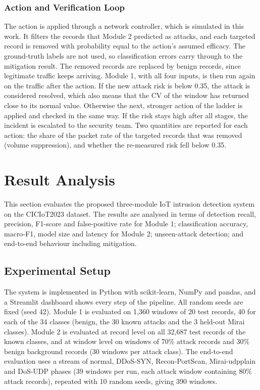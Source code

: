 \documentclass[]{interact}
\theoremstyle{plain}%
\theoremstyle{definition}
\theoremstyle{remark}
\begin{document}
\subsubsection{Action and Verification Loop}
The action is applied through a network controller, which is simulated in this work. It filters the records that Module 2 predicted as attacks, and each targeted record is removed with probability equal to the action's assumed efficacy. The ground-truth labels are not used, so classification errors carry through to the mitigation result. The removed records are replaced by benign records, since legitimate traffic keeps arriving. Module 1, with all four inputs, is then run again on the traffic after the action. If the new attack risk is below 0.35, the attack is considered resolved, which also means that the CV of the window has returned close to its normal value. Otherwise the next, stronger action of the ladder is applied and checked in the same way. If the risk stays high after all stages, the incident is escalated to the security team. Two quantities are reported for each action: the share of the packet rate of the targeted records that was removed (volume suppression), and whether the re-measured risk fell below 0.35.

\section{Result Analysis}
This section evaluates the proposed three-module IoT intrusion detection system on the CICIoT2023 dataset. The results are analysed in terms of detection recall, precision, F1-score and false-positive rate for Module 1; classification accuracy, macro-F1, model size and latency for Module 2; unseen-attack detection; and end-to-end behaviour including mitigation.

\subsection{Experimental Setup}\label{sec:setup}
The system is implemented in Python with scikit-learn, NumPy and pandas, and a Streamlit dashboard shows every step of the pipeline. All random seeds are fixed (seed 42). Module 1 is evaluated on 1,360 windows of 20 test records, 40 for each of the 34 classes (benign, the 30 known attacks and the 3 held-out Mirai classes). Module 2 is evaluated at record level on all 32,687 test records of the known classes, and at window level on windows of 70\% attack records and 30\% benign background records (30 windows per attack class). The end-to-end evaluation uses a stream of normal, DDoS-SYN, Recon-PortScan, Mirai-udpplain and DoS-UDP phases (39 windows per run, each attack window containing 80\% attack records), repeated with 10 random seeds, giving 390 windows.
\end{document}
